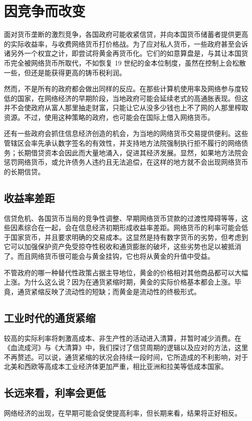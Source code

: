 \section{因竞争而改变}
面对货币垄断的激烈竞争，各国政府可能收紧信贷，并向本国货币储蓄者提供更高的实际收益率，与收费网络货币打价格战。为了应对私人货币，一些政府甚至会诉诸另外一个权宜之计，即尝试将黄金再货币化。它们的如意算盘是，与其让本国货币完全被网络货币所取代，不如恢复 19 世纪的金本位制度，虽然在控制上会松散一些，但还是能获得更高的铸币税利润。

然而，不是所有的政府都会做出同样的反应。在那些计算机使用率及网络参与度较低的国家，在网络经济的早期阶段，当地政府可能会延续老式的高通胀表现。但这并不会使政府从富人那里抽走财富，只能让它从没多少钱也上不了网的人那里榨取资源。不过，使用这种策略的政府，也可能会在国际上借入网络货币。

还有一些政府会抓住信息经济创造的机会，为当地的网络货币交易提供便利。这些管辖区会率先承认数字签名的有效性，并支持地方法院强制执行拒不履行的网络债务；长期借贷资本会因此而大量地涌入，促进其经济发展。显然，如果地方法院会惩罚网络货币，或允许债务人违约且无法追偿，在这样的地方就不会出现网络货币的长期信贷。

\subsection{收益率差距}
信贷危机、各国货币当局的竞争性调整、早期网络货币贷款的过渡性障碍等等，这些因素综合在一起，会在信息经济初期形成收益率差距。网络货币的利率可能会低于国家货币，并且要求明确的交易成本。这显然是持有数字货币的劣势，但考虑到它可以加强保护资产免受掠夺性税收和通货膨胀的破坏，这些劣势也足以被抵消了。而且网络货币很可能会与黄金挂钩，它也将从黄金的升值中受益。

不管政府的哪一种替代性政策占据主导地位，黄金的价格相对其他商品都可以大幅上涨。为什么这么说？因为在通货紧缩时期，黄金的实际价格基本都会上涨。毕竟，通货紧缩反映了流动性的短缺；而黄金是流动性的终极形式。

\subsection{工业时代的通货紧缩}
较高的实际利率将刺激高成本、非生产性的活动进入清算，并暂时减少消费。在《血流成河》与《大清算》中，我们探讨了信贷周期的逻辑以及应对的方法，这里不再赘述。可以说，通货紧缩的状况会持续一段时间，它所造成的不利影响，对于北美和西欧等高成本工业经济体更加严重，相比亚洲和拉美等低成本国家。

\subsection{长远来看，利率会更低}
网络经济的出现，在早期可能会促使提高利率，但长期来看，结果将正好相反。

